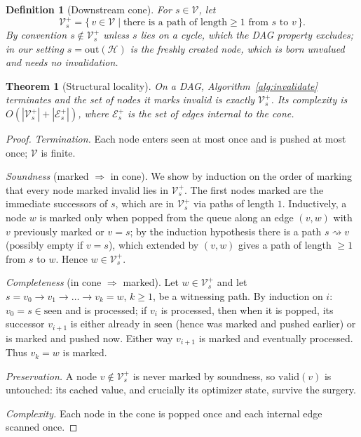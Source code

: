 \documentclass[11pt,a4paper]{article}
\newtheorem{theorem}{Theorem}
\newtheorem{definition}{Definition}
\newcommand{\Hb}{\mathcal{H}}
\newcommand{\V}{\mathcal{V}}
\newcommand{\E}{\mathcal{E}}
\begin{document}
\begin{definition}[Downstream cone]
For $s \in \V$, let
\[
\V_s^{+} = \{\, v \in \V \mid \text{there is a path of length} \geq 1 \text{ from } s \text{ to } v \,\}.
\]
By convention $s \notin \V_s^{+}$ unless $s$ lies on a cycle, which the DAG property excludes; in our setting $s = \mathrm{out}(\Hb)$ is the freshly created node, which is born unvalued and needs no invalidation.
\end{definition}

\begin{theorem}[Structural locality]
\label{thm:locality}
On a DAG, Algorithm~\ref{alg:invalidate} terminates and the set of nodes it marks invalid is exactly $\V_s^{+}$. Its complexity is $O(|\V_s^{+}| + |\E_s^{+}|)$, where $\E_s^{+}$ is the set of edges internal to the cone.
\end{theorem}

\begin{proof}
\emph{Termination.} Each node enters $\mathrm{seen}$ at most once and is pushed at most once; $\V$ is finite.

\emph{Soundness} (marked $\Rightarrow$ in cone). We show by induction on the order of marking that every node marked invalid lies in $\V_s^{+}$. The first nodes marked are the immediate successors of $s$, which are in $\V_s^{+}$ via paths of length $1$. Inductively, a node $w$ is marked only when popped from the queue along an edge $(v, w)$ with $v$ previously marked or $v = s$; by the induction hypothesis there is a path $s \rightsquigarrow v$ (possibly empty if $v = s$), which extended by $(v,w)$ gives a path of length $\geq 1$ from $s$ to $w$. Hence $w \in \V_s^{+}$.

\emph{Completeness} (in cone $\Rightarrow$ marked). Let $w \in \V_s^{+}$ and let $s = v_0 \to v_1 \to \dots \to v_k = w$, $k \geq 1$, be a witnessing path. By induction on $i$: $v_0 = s \in \mathrm{seen}$ and is processed; if $v_i$ is processed, then when it is popped, its successor $v_{i+1}$ is either already in $\mathrm{seen}$ (hence was marked and pushed earlier) or is marked and pushed now. Either way $v_{i+1}$ is marked and eventually processed. Thus $v_k = w$ is marked.

\emph{Preservation.} A node $v \notin \V_s^{+}$ is never marked by soundness, so $\mathrm{valid}(v)$ is untouched: its cached value, and crucially its optimizer state, survive the surgery.

\emph{Complexity.} Each node in the cone is popped once and each internal edge scanned once.
\end{proof}
\end{document}
